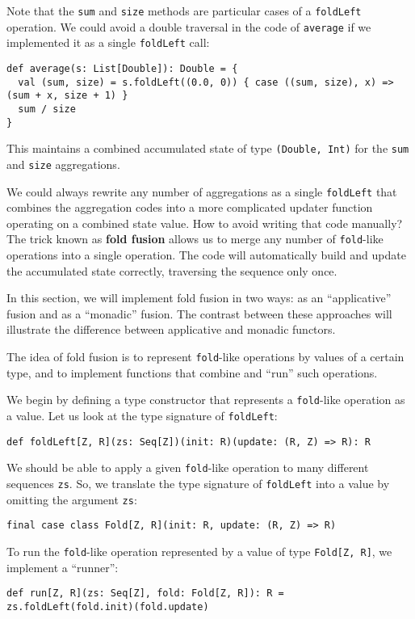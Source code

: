 Note that the \lstinline!sum! and \lstinline!size! methods are particular
cases of a \lstinline!foldLeft! operation. We could avoid a double
traversal in the code of \lstinline!average! if we implemented it
as a single \lstinline!foldLeft! call:
\begin{lstlisting}
def average(s: List[Double]): Double = {
  val (sum, size) = s.foldLeft((0.0, 0)) { case ((sum, size), x) => (sum + x, size + 1) }
  sum / size
}
\end{lstlisting}
This maintains a combined accumulated state of type \lstinline!(Double, Int)!
for the \lstinline!sum! and \lstinline!size! aggregations. 

We could always rewrite any number of aggregations as a single \lstinline!foldLeft!
that combines the aggregation codes into a more complicated updater
function operating on a combined state value. How to avoid writing
that code manually? The trick known as \textbf{fold fusion}
allows us to merge any number of \lstinline!fold!-like operations
into a single operation. The code will automatically build and update
the accumulated state correctly, traversing the sequence only once.

In this section, we will implement fold fusion in two ways: as an
\textsf{``}applicative\textsf{''} fusion and as a \textsf{``}monadic\textsf{''} fusion. The contrast
between these approaches will illustrate the difference between applicative
and monadic functors.

The idea of fold fusion is to represent \lstinline!fold!-like operations
by values of a certain type, and to implement functions that combine
and \textsf{``}run\textsf{''} such operations.

We begin by defining a type constructor that represents a \lstinline!fold!-like
operation as a value. Let us look at the type signature of \lstinline!foldLeft!:
\begin{lstlisting}
def foldLeft[Z, R](zs: Seq[Z])(init: R)(update: (R, Z) => R): R
\end{lstlisting}
We should be able to apply a given \lstinline!fold!-like operation
to many different sequences \lstinline!zs!. So, we translate the
type signature of \lstinline!foldLeft! into a value by omitting the
argument \lstinline!zs!:
\begin{lstlisting}
final case class Fold[Z, R](init: R, update: (R, Z) => R)
\end{lstlisting}
To run the \lstinline!fold!-like operation represented by a value
of type \lstinline!Fold[Z, R]!, we implement a \textsf{``}runner\textsf{''}:
\begin{lstlisting}
def run[Z, R](zs: Seq[Z], fold: Fold[Z, R]): R = zs.foldLeft(fold.init)(fold.update)
\end{lstlisting}

